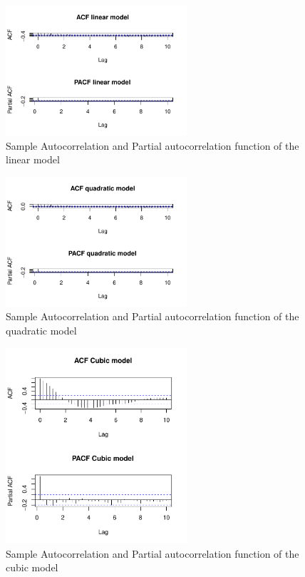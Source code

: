 \documentclass[11pt,a4paper]{article}
\begin{document}
\begin{figure}
\centering
\includegraphics[angle=0,
width=0.6\textwidth]{acf_pacf_linearmodel}
\caption{Sample Autocorrelation and Partial autocorrelation function of the linear model
\label{fig:acf_linearmodel}}
\end{figure}
\begin{figure}
\centering
\includegraphics[angle=0,
width=0.6\textwidth]{acf_pacf_quadraticmodel}
\caption{Sample Autocorrelation and Partial autocorrelation function of the quadratic model
\label{fig:acf_quadraticmodel}}
\end{figure}
\begin{figure}
\centering
\includegraphics[angle=0,
width=0.6\textwidth]{acf_pacf_cubicmodel}
\caption{Sample Autocorrelation and Partial autocorrelation function of the cubic model
\label{fig:acf_cubicmodel}}
\end{figure}
\end{document}

